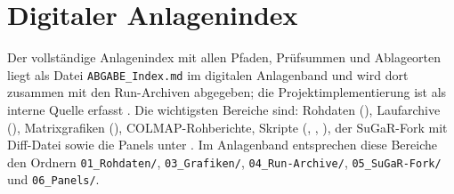 \section{Digitaler Anlagenindex}

Der vollständige Anlagenindex mit allen Pfaden, Prüfsummen und Ablageorten
liegt als Datei \texttt{ABGABE\_Index.md} im digitalen Anlagenband und wird
dort zusammen mit den Run-Archiven abgegeben; die Projektimplementierung ist
als interne Quelle erfasst \parencite{scan2bimImplementation}. Die wichtigsten
Bereiche sind: Rohdaten (), Laufarchive
(), Matrixgrafiken (),
COLMAP-Rohberichte, Skripte (, ,
), der SuGaR-Fork mit Diff-Datei sowie die Panels unter
. Im Anlagenband entsprechen diese Bereiche den Ordnern
\texttt{01\_Rohdaten/}, \texttt{03\_Grafiken/}, \texttt{04\_Run-Archive/},
\texttt{05\_SuGaR-Fork/} und \texttt{06\_Panels/}.
